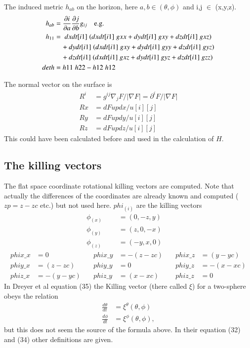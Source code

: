 \documentclass[11pt,a4paper,twoside]{article}
\begin{document}
The induced metric $h_{ab}$ on the horizon, here $a,b \in (\theta,\phi)$ and
i,j $\in$ (x,y,z). 
\begin{align}
  h_{ab} &= \frac {\partial i} {\partial a} 
           \frac {\partial j} {\partial b} g_{ij} \quad \text {e.g.}\\
  h_{11} & =\; dxdt[i1]\;(dxdt[i1]\;gxx+dydt[i1]\;gxy+dzdt[i1]\;gxz) \notag\\
   &\quad   +dydt[i1]\;(dxdt[i1]\;gxy+dydt[i1]\;gyy+dzdt[i1]\;gyz) \notag\\
   &\quad   +dzdt[i1]\;(dxdt[i1]\;gxz+dydt[i1]\;gyz+dzdt[i1]\;gzz) \\
  deth &= h11\; h22 - h12 \; h12 
\end{align}


The normal vector on the surface is 
\begin{align}
  R^i&=g^{ij}\nabla_j F/ |\nabla F|= \partial^i F / |\nabla F| \\
  Rx &= dFupdx/u[i][j]\\
  Ry &= dFupdy/u[i][j]\\
  Rz &= dFupdz/u[i][j]
\end{align}
This could have been calculated before and used in the calculation of $H$.


\subsection{The killing vectors}   
The flat space coordinate rotational killing vectors are computed.
Note that actually the differences of the coordinates are already known and computed 
($zp=z-zc$ etc.) but not used here. $phi_{(i)}$ are the killing vectors
\begin{align}
  & & \phi_{(x)} &= (0, -z, y)\\
  & & \phi_{(y)} &= (z, 0, -x)\\
  & & \phi_{(z)} &= (-y, x, 0)\\
   phix\_x &=  0     & \quad phix\_y &= -(z-zc) &\quad phix\_z &=  (y-yc) \\
   phiy\_x &= (z-zc) & \quad phiy\_y &=  0      &\quad phiy\_z &= -(x-xc) \\
   phiz\_x &= -(y-yc)& \quad phiz\_y &=  (x-xc) &\quad phiz\_z &=  0
\end{align}
\warningsymbol In Dreyer et al \cite{Dreyer:2002mx} equation (35) the Killing vector 
(there called $\xi$) for a two-sphere obeys the relation 
\begin{align}
  \frac {d\theta}{dt} &= \xi^{\theta}(\theta,\phi)\\
  \frac {d\phi}  {dt} &= \xi^{\phi}  (\theta,\phi),
\end{align}
but this does not seem the source of the formula above. In their equation (32) and (34)
other definitions are given.
\end{document}
